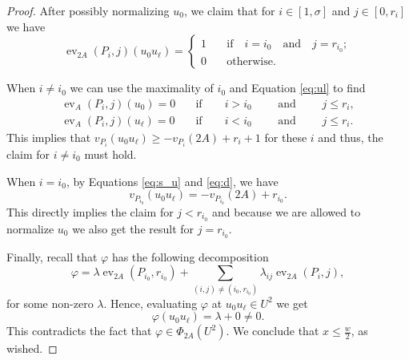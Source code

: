 \documentclass[10pt,a4paper]{amsart}
\DeclareMathOperator{\ev}{ev}
\renewcommand{\geq}{\geqslant}
\renewcommand{\leq}{\leqslant}
\begin{document}
\begin{proof}
		After possibly normalizing $u_0$, we claim that for $i \in [1, \sigma]$ and $j \in [0, r_i]$ we have
		$$ \ev_{ 2A}(P_i,j) (u_0 u_\ell) = \begin{cases}
			1 &\quad \text{if}\quad i=i_0 \quad\text{and}\quad j=r_{i_0};\\0& \quad\text{otherwise}.
		\end{cases}$$
		
		When $i \neq i_0$ we can use the maximality of $i_0$ and Equation \eqref{eq:ul} to find
		\begin{align*}\ev_A(P_i,j) (u_0) =0 
			&\quad\text{if}\qquad i> i_0 \qquad \text{ and } \qquad  j\le r_i,\\
			\ev_A(P_i,j) (u_\ell) =0 &\quad\text{if}\qquad i< i_0 \qquad \text{ and } \qquad j\le r_i.
		\end{align*}
		This implies that $v_{P_i}(u_0 u_\ell) \geq -v_{P_i}(2A) + r_i + 1$ for these $i$ and thus, the claim for $i \neq i_0$ must hold.
		
		When $i = i_0$, by Equations \eqref{eq:s_u} and \eqref{eq:d}, 
		we have 
		$$ v_{P_{i_0}}(u_0 u_\ell) = -v_{P_{i_0}}(2A)+ r_{i_0}.  $$ 
		This directly implies the claim for $j < r_{i_0}$ and because we are allowed to normalize $u_0$ we also get the result for $j = r_{i_0}$. 
		
		Finally, recall that $\varphi$ has the following decomposition
		$$\varphi = \lambda \ev_{2A} (P_{i_0} ,  r_{i_0}) + \sum_{ (i,j)\neq (i_0,r_{i_0})}\lambda_{i j} \ev_{2A}(P_i,j ), $$
		for some non-zero $\lambda$. Hence, evaluating $\varphi$ at
		$u_0 u_\ell \in U^2$ we get
		$$\varphi (u_0 u_\ell) = \lambda + 0\neq 0. $$
		This contradicts the fact that $\varphi\in \Phi_{2A}(U^2).$ We conclude that $x \leq \frac w2$, as wished.
	\end{proof}
\end{document}
